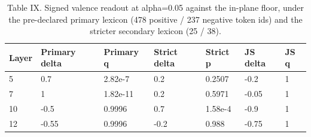 \begin{table}[t]
\centering
\caption{Table IX. Signed valence readout at alpha=0.05 against the in-plane floor, under the pre-declared primary lexicon (478 positive / 237 negative token ids) and the stricter secondary lexicon (25 / 38).}
\label{tab:ix}
\begin{tabular}{lllllll}
\toprule
Layer & Primary delta & Primary q & Strict delta & Strict p & JS delta & JS q \\
\midrule
5 & 0.7 & 2.82e-7 & 0.2 & 0.2507 & -0.2 & 1 \\
7 & 1 & 1.82e-11 & 0.2 & 0.5971 & -0.05 & 1 \\
10 & -0.5 & 0.9996 & 0.7 & 1.58e-4 & -0.9 & 1 \\
12 & -0.55 & 0.9996 & -0.2 & 0.988 & -0.75 & 1 \\
\bottomrule
\end{tabular}
\end{table}